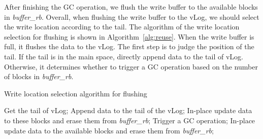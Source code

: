 \documentclass[sigconf]{acmart}
\begin{document}
After finishing the GC operation, we flush the write buffer to the available blocks in \textit{buffer\_rb}. Overall, when flushing the write buffer to the vLog, we should select the write location according to the tail. The algorithm of the write location selection for flushing is shown in Algorithm~\ref{alg:reuse}. When the write buffer is full, it flushes the data to the vLog. The first step is to judge the position of the tail. If the tail is in the main space, directly append data to the tail of vLog. Otherwise, it determines whether to trigger a GC operation based on the number of blocks in \textit{buffer\_rb}. 

\begin{algorithm}[htbp]
	\caption{Write location selection algorithm for flushing}
	\begin{algorithmic}[1]
		\STATE Get the tail of vLog; 
		\STATE Append data to the tail of the vLog;
		\ELSE
		\STATE In-place update data to these blocks and erase them from \textit{buffer\_rb};
		\ELSE
		\STATE Trigger a GC operation; 
		\STATE In-place update data to the available blocks and erase them from \textit{buffer\_rb};
		\ENDIF
		\ENDIF			
	\end{algorithmic}
	\label{alg:reuse}
\end{algorithm}
 
\end{document}
